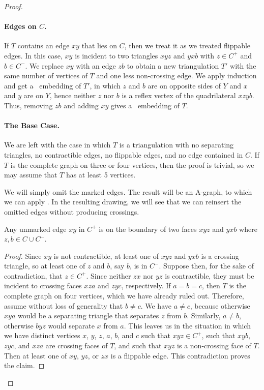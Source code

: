 \begin{proof}
	\paragraph{Edges on $C$.}
	
	If $T$ contains an edge $xy$ that lies on $C$, then we treat it as we treated flippable edges. In this case, $xy$ is incident to two triangles $xyz$ and $yxb$ with $z\in C^+$ and $b\in C^-$. We replace $xy$ with an edge $zb$ to obtain a new triangulation $T'$ with the same number of vertices of $T$ and one less non-crossing edge. We apply induction and get a \Fary\ embedding of $T'$, in which $z$ and $b$ are
	on opposite sides of $Y$ and $x$ and $y$ are on $Y$, hence 	neither $z$ nor $b$ is a reflex vertex of the quadrilateral $xzyb$.
	Thus, removing $zb$ and adding $xy$ gives a \Fary\ embedding of $T$.
	
	\paragraph{The Base Case.}
	
	We are left with the case in which $T$ is a triangulation
	with no separating triangles, no contractible edges, no flippable
	edges, and no edge contained in $C$.  If $T$ is the complete graph
	on three or four vertices, then the proof is trivial,
	so we may assume that $T$ has at least 5 vertices.

        We will simply omit the marked edges. The result will be an
        A-graph, to which we can apply . In the
        resulting drawing, we will see that we can reinsert the
        omitted edges without producing crossings.

        
	\begin{claimx} 
	Any unmarked edge $xy$ in $C^+$ is on the boundary of two
        faces $xyz$ and $yxb$ where $z,b\in C \cup C^-$.
	\end{claimx}
		
	\begin{proof}
	Since $xy$ is not contractible, at least one of $xyz$ and $yxb$ is a
	crossing triangle, so at least one of $z$ and $b$, say $b$, is in $C^-$.
	Suppose then, for the sake of contradiction, that $z\in C^+$. Since neither $zx$ nor $yz$ is contractible,
	they must be incident to crossing faces $xza$ and $zyc$, respectively.
	If $a=b=c$, then $T$ is the complete graph on four vertices,
	which we have already ruled out.  Therefore, assume without loss of
	generality that $b\neq c$.  %
	We have $a\neq c$, because otherwise $xya$ would
be a separating triangle that
        separates $z$ from $b$. Similarly, $a\neq b$, otherwise $byz$ would separate $x$ from $a$.	
	This leaves us in the situation in which we have distinct vertices $x$,
	$y$, $z$, $a$, $b$, and $c$ such that $xyz\in C^+$, such that $xyb$, $zyc$, and $xza$
	are crossing faces of $T$, and such that $xyz$ is a non-crossing face of $T$.
	Then at least one of $xy$, $yz$, or $zx$ is a flippable edge. This contradiction proves the claim.
\end{proof}	


\end{proof}
